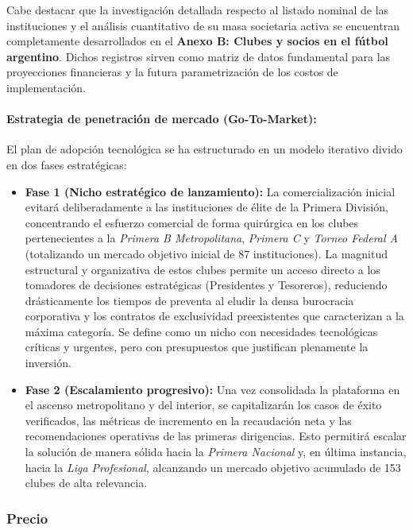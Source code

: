 Cabe destacar que la investigación detallada respecto al listado nominal de las instituciones y el análisis cuantitativo de su masa societaria activa se encuentran completamente desarrollados en el \textbf{Anexo B: Clubes y socios en el fútbol argentino}. Dichos registros sirven como matriz de datos fundamental para las proyecciones financieras y la futura parametrización de los costos de implementación.

\newpage

\paragraph{Estrategia de penetración de mercado (Go-To-Market):}

El plan de adopción tecnológica se ha estructurado en un modelo iterativo divido en dos fases estratégicas:

\begin{itemize}
    \item \textbf{Fase 1 (Nicho estratégico de lanzamiento):} La comercialización inicial evitará deliberadamente a las instituciones de élite de la Primera División, concentrando el esfuerzo comercial de forma quirúrgica en los clubes pertenecientes a la \textit{Primera B Metropolitana}, \textit{Primera C} y \textit{Torneo Federal A} (totalizando un mercado objetivo inicial de 87 instituciones). La magnitud estructural y organizativa de estos clubes permite un acceso directo a los tomadores de decisiones estratégicas (Presidentes y Tesoreros), reduciendo drásticamente los tiempos de preventa al eludir la densa burocracia corporativa y los contratos de exclusividad preexistentes que caracterizan a la máxima categoría. Se define como un nicho con necesidades tecnológicas críticas y urgentes, pero con presupuestos que justifican plenamente la inversión.
    \item \textbf{Fase 2 (Escalamiento progresivo):} Una vez consolidada la plataforma en el ascenso metropolitano y del interior, se capitalizarán los casos de éxito verificados, las métricas de incremento en la recaudación neta y las recomendaciones operativas de las primeras dirigencias. Esto permitirá escalar la solución de manera sólida hacia la \textit{Primera Nacional} y, en última instancia, hacia la \textit{Liga Profesional}, alcanzando un mercado objetivo acumulado de 153 clubes de alta relevancia.
\end{itemize}

\subsubsection*{Precio}

